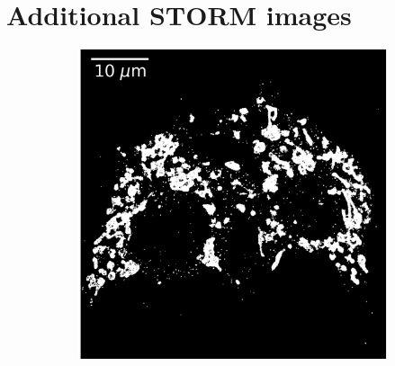 \section{Additional STORM images}

\begin{figure}[htbp]
    \begin{subfigure}{0.49\textwidth}
        \includegraphics[width=\textwidth]{figures/mitochondria_image5.png}
        \caption{}
    \end{subfigure}
    \begin{subfigure}{0.49\textwidth}

\end{subfigure}
\end{figure}
